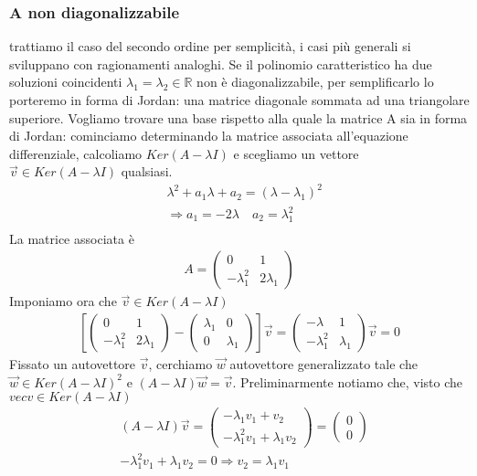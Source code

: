 \documentclass[10pt,a4paper]{article}
\begin{document}
\subsubsection{A non diagonalizzabile}
trattiamo il caso del secondo ordine per semplicità, i casi più generali si sviluppano con ragionamenti analoghi. Se il polinomio caratteristico ha due soluzioni coincidenti \(\lambda_1=\lambda_2\in \mathbb{R}\) non è diagonalizzabile, per semplificarlo lo porteremo in forma di Jordan: una matrice diagonale sommata ad una triangolare superiore. Vogliamo trovare una base rispetto alla quale la matrice A sia in forma di Jordan: cominciamo determinando la matrice associata all'equazione differenziale, calcoliamo \(Ker(A-\lambda I)\) e scegliamo un vettore $\vec{v}\in Ker(A-\lambda I)$ qualsiasi.
\begin{align*}
  &\lambda^2+a_1\lambda+a_2=(\lambda-\lambda_1)^2\\
  &\Rightarrow a_1 = -2\lambda\quad a_2 = \lambda_1^2\\
\end{align*}
La matrice associata è
\begin{align*}
A=\begin{pmatrix}
	0&1\\
	-\lambda_1^2&2\lambda_1
\end{pmatrix}
\end{align*} 
Imponiamo ora che $\vec{v}\in Ker(A-\lambda I)$\\
\begin{align*}
\left[
	\begin{pmatrix}
		0&1\\
		-\lambda_1^2&2\lambda_1
	\end{pmatrix}-
	\begin{pmatrix}
		\lambda_1&0\\
		0&\lambda_1
	\end{pmatrix}
\right]\vec{v} = 
\begin{pmatrix}
	-\lambda&1\\
	-\lambda_1^2&\lambda_1
\end{pmatrix}\vec{v}=0
\end{align*} 
Fissato un autovettore $\vec{v}$, cerchiamo $\vec{w}$ autovettore generalizzato tale che \(\vec{w}\in Ker(A-\lambda I)^2\) e \((A-\lambda I)\vec{w} = \vec{v}\). Preliminarmente notiamo che, visto che \(vec{v}\in Ker(A-\lambda I)\)
\begin{align*}
	&(A-\lambda I )\vec{v} = 
	\begin{pmatrix}
	-\lambda_1 v_1+v_2\\
	-\lambda_1^2 v_1 + \lambda_1 v_2	
	\end{pmatrix}=
	\begin{pmatrix}
		0\\
		0
	\end{pmatrix}\\
	&-\lambda_1^2 v_1 + \lambda_1 v_2 = 0 \Rightarrow  v_2 = \lambda_1 v_1
\end{align*}
\end{document}
